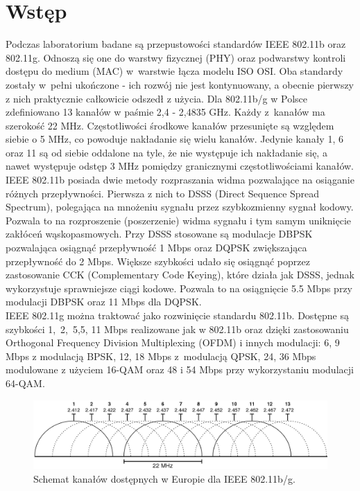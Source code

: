 \documentclass[12pt, a4paper, oneside]{article}
\begin{document}
\section{Wstęp}
\indent\indent Podczas laboratorium badane są przepustowości standardów IEEE 802.11b oraz 802.11g. Odnoszą się one do warstwy fizycznej (PHY) oraz podwarstwy kontroli dostępu do medium (MAC) w~warstwie łącza modelu ISO OSI. Oba standardy zostały w~pełni ukończone - ich rozwój nie jest kontynuowany, a obecnie pierwszy z nich praktycznie całkowicie odszedł z użycia. Dla 802.11b/g w Polsce zdefiniowano 13 kanałów w paśmie 2,4 - 2,4835 GHz. Każdy z~kanałów ma szerokość 22 MHz. Częstotliwości środkowe kanałów przesunięte są względem siebie o 5 MHz, co powoduje nakładanie się wielu kanałów. Jedynie kanały 1, 6 oraz 11 są od siebie oddalone na tyle, że nie występuje ich nakładanie się, a nawet występuje odstęp 3 MHz pomiędzy granicznymi częstotliwościami kanałów.\\
\indent IEEE 802.11b posiada dwie metody rozpraszania widma pozwalające na osiąganie różnych przepływności. Pierwsza z nich to DSSS (Direct Sequence Spread Spectrum), polegająca na mnożeniu sygnału przez szybkozmienny sygnał kodowy. Pozwala to na rozproszenie (poszerzenie) widma sygnału i tym samym uniknięcie zakłóceń wąskopasmowych. Przy DSSS stosowane są modulacje DBPSK pozwalająca osiągnąć przepływność 1 Mbps oraz DQPSK zwiększająca przepływność do 2 Mbps. Większe szybkości udało się osiągnąć poprzez zastosowanie CCK (Complementary Code Keying), które działa jak DSSS, jednak wykorzystuje sprawniejsze ciągi kodowe. Pozwala to na osiągnięcie 5.5 Mbps przy modulacji DBPSK oraz 11 Mbps dla DQPSK.\\
\indent IEEE 802.11g można traktować jako rozwinięcie standardu 802.11b. Dostępne są szybkości 1,~2,~5,5, 11 Mbps realizowane jak w 802.11b oraz dzięki zastosowaniu Orthogonal Frequency Division Multiplexing (OFDM) i innych modulacji: 6, 9 Mbps z modulacją BPSK, 12, 18 Mbps z~modulacją QPSK, 24, 36 Mbps modulowane z użyciem 16-QAM oraz 48 i 54 Mbps przy wykorzystaniu modulacji 64-QAM.
\begin{figure}[h!]
\centering
\includegraphics[scale=0.45]{pics/f2.png}
\caption{Schemat kanałów dostępnych w Europie dla IEEE 802.11b/g.}
\end{figure}\\
\end{document}
